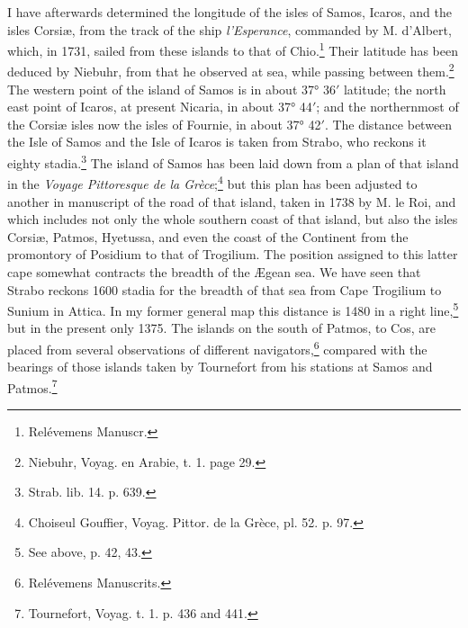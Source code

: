 \documentclass[a4paper, 11pt, oneside, polutonikogreek, english]{article}
\begin{document}
I have afterwards determined the longitude of the isles of Samos, Icaros, and the isles Corsiæ, from the track of the ship \emph{l'Esperance}, commanded by M. d'Albert, which, in 1731, sailed from these islands to that of Chio.\footnote{Relévemens Manuscr.} Their latitude has been deduced by Niebuhr, from that he observed at sea, while passing between them.\footnote{Niebuhr, Voyag. en Arabie, t. 1. page 29.} The western point of the island of Samos is in about 37° 36$'$ latitude; the north east point of Icaros, at present Nicaria, in about 37° 44$'$; and the northernmost of the Corsiæ isles now the isles of Fournie, in about 37° 42$'$. The distance between the Isle of Samos and the Isle of Icaros is taken from Strabo, who reckons it eighty stadia.\footnote{Strab. lib. 14. p. 639.} The island of Samos has been laid down from a plan of that island in the \emph{Voyage Pittoresque de la Grèce};\footnote{Choiseul Gouffier, Voyag. Pittor. de la Grèce, pl. 52. p. 97.} but this plan has been adjusted to another in manuscript of the road of that island, taken in 1738 by M. le Roi, and which includes not only the whole southern coast of that island, but also the isles Corsiæ, Patmos, Hyetussa, and even the coast of the Continent from the promontory of Posidium to that of Trogilium. The position assigned to this latter cape somewhat contracts the breadth of the Ægean sea. We have seen that Strabo reckons 1600 stadia for the breadth of that sea from Cape Trogilium to Sunium in Attica. In my former general map this distance is 1480 in a right line,\footnote{See above, p. 42, 43.} but in the present only 1375. The islands on the south of Patmos, to Cos, are placed from several observations of different navigators,\footnote{Relévemens Manuscrits.} compared with the bearings of those islands taken by Tournefort from his stations at Samos and Patmos.\footnote{Tournefort, Voyag. t. 1. p. 436 and 441.}
\end{document}
